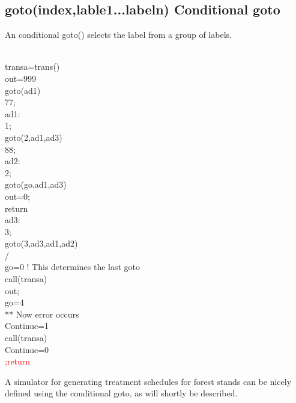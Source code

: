 \subsection{\textcolor{VioletRed}{goto}(index,lable1...labeln) Conditional goto}
\label{goto2}
An conditional \textcolor{VioletRed}{goto}() selects the label from a group of labels.
\begin{example}[congotoex]\\
\label{congotoex}
transa=\textcolor{VioletRed}{trans}()\\
out=999\\
\textcolor{VioletRed}{goto}(ad1)\\
77;\\
ad1:\\
1;\\
\textcolor{VioletRed}{goto}(2,ad1,ad3)\\
88;\\
ad2:\\
2;\\
\textcolor{VioletRed}{goto}(go,ad1,ad3)\\
out=0;\\
return\\
ad3:\\
3;\\
\textcolor{VioletRed}{goto}(3,ad3,ad1,ad2)\\
/\\
go=0  ! This determines the last goto\\
\textcolor{VioletRed}{call}(transa)\\
out;\\
go=4\\
** Now error occurs\\
Continue=1\\
\textcolor{VioletRed}{call}(transa)\\
Continue=0\\
\textcolor{Red}{;return}
\end{example}
\begin{note}
A simulator for generating treatment schedules for forest stands
can be nicely defined using the conditional goto, as will shortly be described.
\end{note}
